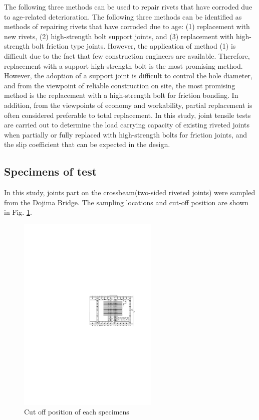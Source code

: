 The following three methods can be used to repair rivets that have corroded due to age-related deterioration. The following three methods can be identified as methods of repairing rivets that have corroded due to age: (1) replacement with new rivets, (2) high-strength bolt support joints, and (3) replacement with high-strength bolt friction type joints. However, the application of method (1) is difficult due to the fact that few construction engineers are available. Therefore, replacement with a support high-strength bolt is the most promising method. However, the adoption of a support joint is difficult to control the hole diameter, and from the viewpoint of reliable construction on site, the most promising method is the replacement with a high-strength bolt for friction bonding. In addition, from the viewpoints of economy and workability, partial replacement is often considered preferable to total replacement. In this study, joint tensile tests are carried out to determine the load carrying capacity of existing riveted joints when partially or fully replaced with high-strength bolts for friction joints, and the slip coefficient that can be expected in the design.


\subsection{Specimens of test}

In this study, joints part on the crossbeam(two-sided riveted joints) were sampled from the Dojima Bridge. The sampling locations and cut-off position are shown in Fig. \ref{fig-cutoff}.

\begin{figure}
    \centering
    \includegraphics[width=0.6\textwidth]{imgs/ch4/figA1.pdf}
    \caption{Cut off position of each specimens}
    \label{fig-cutoff}
\end{figure}

